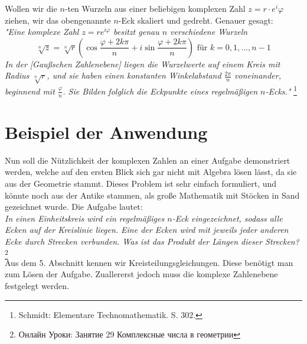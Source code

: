 \documentclass[a4paper,12pt]{article} %
\begin{document}
\begin{figure}[H]
	
\end{figure}


Wollen wir die $n$-ten Wurzeln aus einer beliebigen komplexen Zahl $z=r\cdot e^i\varphi$ ziehen, wir das obengenannte $n$-Eck skaliert und gedreht.
Genauer gesagt:\\

\noindent\emph{"{}Eine komplexe Zahl $z=r e^{i\varphi}$ besitzt genau $n$ verschiedene Wurzeln}
\begin{equation}\label{vieleck}
	\sqrt[n]{z}=\sqrt[n]{r}\left(\cos\frac{\varphi+2k\pi}{n}+i\sin\frac{\varphi+2k\pi}{n}\right) \textrm{ für } k=0, 1, \dots, n-1
\end{equation}
\emph{In der [Gaußschen Zahlenebene] liegen die Wurzelwerte auf einem Kreis mit Radius $\sqrt[n]{r}$, und sie haben einen konstanten Winkelabstand $\frac{2\pi}{n}$ voneinander, beginnend mit $\frac{\varphi}{n}$. Sie Bilden folglich die Eckpunkte eines regelmäßigen $n$-Ecks."} \footnote{Schmidt: Elementare Technomathematik. S. $302$.}











\section{Beispiel der Anwendung}

Nun soll die Nützlichkeit der komplexen Zahlen an einer Aufgabe demonstriert werden, welche auf den ersten Blick sich gar nicht mit Algebra lösen lässt, da sie aus der Geometrie stammt. Dieses Problem ist sehr einfach formuliert, und könnte noch aus der Antike stammen, als große Mathematik mit Stöcken in Sand gezeichnet wurde. Die Aufgabe lautet:\\

\noindent \textit{In einen Einheitskreis wird ein regelmäßiges $n$-Eck eingezeichnet, sodass alle Ecken auf der Kreislinie liegen.
Eine der Ecken wird mit jeweils jeder anderen Ecke durch Strecken verbunden.
Was ist das Produkt der Längen dieser Strecken?}\footnote{Онлайн Уроки: Занятие 29 Комплексные числа в геометрии}\\


Aus dem 5. Abschnitt kennen wir Kreisteilungsgleichungen. Diese benötigt man zum Lösen der Aufgabe. Zuallererst jedoch muss die komplexe Zahlenebene festgelegt werden. 
\end{document}
